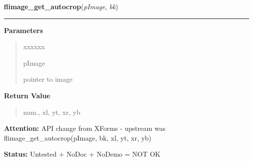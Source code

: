 \hspace{.8\funcindent}\begin{boxedminipage}{\funcwidth}

    \raggedright \textbf{flimage\_get\_autocrop}(\textit{pImage}, \textit{bk})

    \vspace{-1.5ex}

    \rule{\textwidth}{0.5\fboxrule}
\setlength{\parskip}{2ex}
\setlength{\parskip}{1ex}
      \textbf{Parameters}
      \vspace{-1ex}

      \begin{quote}
        \begin{Ventry}{xxxxxx}

          \item[pImage]

          pointer to image

        \end{Ventry}

      \end{quote}

      \textbf{Return Value}
    \vspace{-1ex}

      \begin{quote}
      num., xl, yt, xr, yb

      \end{quote}

\textbf{Attention:} API change from XForms - upstream was flimage\_get\_autocrop(pImage, bk, 
xl, yt, xr, yb)



\textbf{Status:} Untested + NoDoc + NoDemo = NOT OK



    \end{boxedminipage}

    \label{xformslib:library:flimage_crop}

    \vspace{0.5ex}

